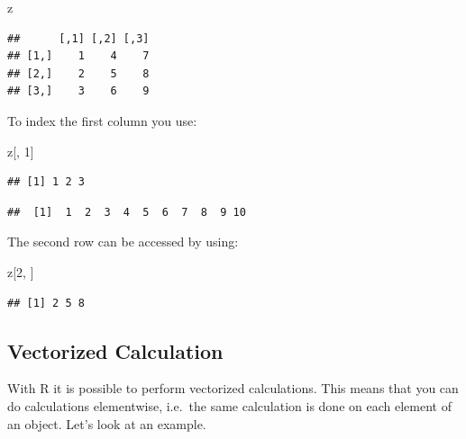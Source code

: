 \documentclass[
]{book}
\newenvironment{Shaded}{\begin{snugshade}}{\end{snugshade}}
\newcommand{\DecValTok}[1]{\textcolor[rgb]{0.00,0.00,0.81}{#1}}
\newcommand{\NormalTok}[1]{#1}
\newcommand{\OperatorTok}[1]{\textcolor[rgb]{0.81,0.36,0.00}{\textbf{#1}}}
\begin{document}
\begin{Shaded}
\begin{Highlighting}[]
\NormalTok{z}
\end{Highlighting}
\end{Shaded}

\begin{verbatim}
##      [,1] [,2] [,3]
## [1,]    1    4    7
## [2,]    2    5    8
## [3,]    3    6    9
\end{verbatim}

To index the first column you use:

\begin{Shaded}
\begin{Highlighting}[]
\NormalTok{z[, }\DecValTok{1}\NormalTok{]}
\end{Highlighting}
\end{Shaded}

\begin{verbatim}
## [1] 1 2 3
\end{verbatim}

\begin{Shaded}
\end{Shaded}

\begin{verbatim}
##  [1]  1  2  3  4  5  6  7  8  9 10
\end{verbatim}

The second row can be accessed by using:

\begin{Shaded}
\begin{Highlighting}[]
\NormalTok{z[}\DecValTok{2}\NormalTok{, ]}
\end{Highlighting}
\end{Shaded}

\begin{verbatim}
## [1] 2 5 8
\end{verbatim}

\hypertarget{vectorized-calculation}{%
\subsection{Vectorized Calculation}\label{vectorized-calculation}}

With R it is possible to perform vectorized calculations. This means
that you can do calculations elementwise, i.e.~the same calculation is
done on each element of an object. Let's look at an example.
\end{document}
